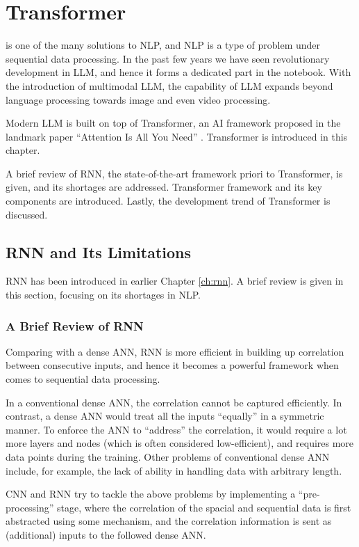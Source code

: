 \chapter{Transformer} \label{ch:transformer}

 is one of the many solutions to NLP, and NLP is a type of problem under sequential data processing. In the past few years we have seen revolutionary development in LLM, and hence it forms a dedicated part in the notebook. With the introduction of multimodal LLM, the capability of LLM expands beyond language processing towards image and even video processing. 

Modern LLM is built on top of Transformer, an AI framework proposed in the landmark paper ``Attention Is All You Need'' \cite{vaswani2017attention}. Transformer is introduced in this chapter. 

A brief review of RNN, the state-of-the-art framework priori to Transformer, is given, and its shortages are addressed. Transformer framework and its key components are introduced. Lastly, the development trend of Transformer is discussed.

\section{RNN and Its Limitations}

RNN has been introduced in earlier Chapter \ref{ch:rnn}. A brief review is given in this section, focusing on its shortages in NLP.

\subsection{A Brief Review of RNN}

Comparing with a dense ANN, RNN is more efficient in building up correlation between consecutive inputs, and hence it becomes a powerful framework when comes to sequential data processing. 

In a conventional dense ANN, the correlation cannot be captured efficiently. In contrast, a dense ANN would treat all the inputs ``equally'' in a symmetric manner. To enforce the ANN to ``address'' the correlation, it would require a lot more layers and nodes (which is often considered low-efficient), and requires more data points during the training. Other problems of conventional dense ANN include, for example, the lack of ability in handling data with arbitrary length.

CNN and RNN try to tackle the above problems by implementing a ``pre-processing'' stage, where the correlation of the spacial and sequential data is first abstracted using some mechanism, and the correlation information is sent as (additional) inputs to the followed dense ANN.

